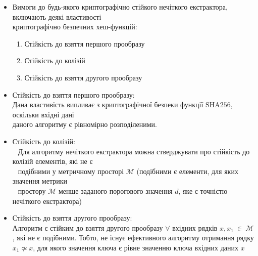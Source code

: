 \documentclass[11pt]{article}
\providecommand{\tightlist}{%
      \setlength{\itemsep}{0pt}\setlength{\parskip}{0pt}}
\begin{document}
\begin{enumerate}
  \begin{itemize}
  \tightlist
  \item
    Вимоги до будь-якого криптографічно стійкого нечіткого екстрактора,
    включають деякі властивості\\
    криптографічно безпечних хеш-функцій:

    \begin{enumerate}
    \def\labelenumii{\arabic{enumii}.}
    \tightlist
    \item
      Стійкість до взяття першого прообразу
    \item
      Стійкість до колізій
    \item
      Стійкість до взяття другого прообразу
    \end{enumerate}
  \item
    Стійкість до взяття першого прообразу:\\
    Дана властивість випливає з криптографічної безпеки функції
    \(\text{SHA256}\), оскільки вхідні дані\\
    даного алгоритму є рівномірно розподіленими.
  \item
    Стійкість до колізій:\\
    \(~~\) Для алгоритму нечіткого екстрактора можна стверджувати про
    стійкість до колізій елементів, які не є\\
    \(~~\) подібними у метричному просторі \(\mathcal{M}\) (подібними є
    елементи, для яких значення метрики\\
    \(~~\) простору \(\mathcal{M}\) менше заданого порогового значення
    \(d\), яке є точністю нечіткого екстрактора)
  \item
    Стійкість до взяття другого прообразу:\\
    Алгоритм є стійким до взяття другого прообразу \(\forall\) вхідних
    рядків \(x,x_1~\in~\mathcal{M}\), які не є подібними. Тобто, не
    існує ефективного алгоритму отримання рядку \(x_1 \not \simeq x\),
    для якого значення ключа є рівне значенню ключа вхідних даних \(x\)
  \end{itemize}
\end{enumerate}
\end{document}
